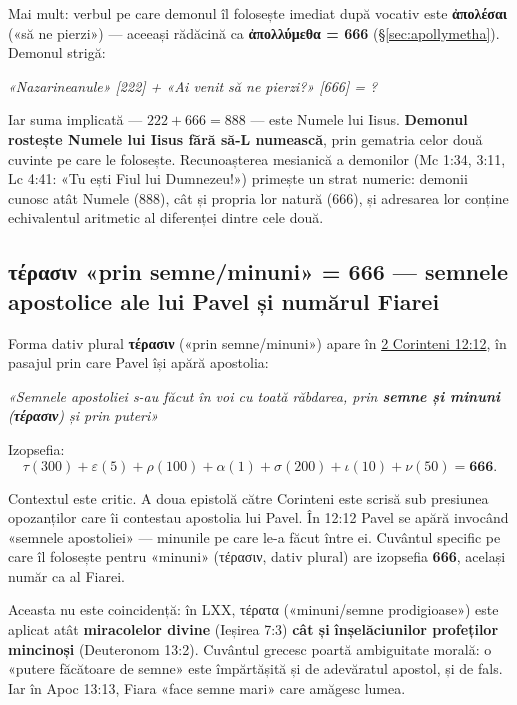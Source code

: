 \documentclass[12pt,a4paper,twoside,openany]{book}
\begin{document}
Mai mult: verbul pe care demonul îl folosește imediat după vocativ este \textbf{ἀπολέσαι} («să ne pierzi») — aceeași rădăcină ca \textbf{ἀπολλύμεθα = 666} (\S\ref{sec:apollymetha}). Demonul strigă:

\begin{biblequote}
\textit{«Nazarineanule» [222] + «Ai venit să ne pierzi?» [666] = ?}
\end{biblequote}

Iar suma implicată — $222 + 666 = 888$ — este Numele lui Iisus. \textbf{Demonul rostește Numele lui Iisus fără să-L numească}, prin gematria celor două cuvinte pe care le folosește. Recunoașterea mesianică a demonilor (Mc 1:34, 3:11, Lc 4:41: «Tu ești Fiul lui Dumnezeu!») primește un strat numeric: demonii cunosc atât Numele (888), cât și propria lor natură (666), și adresarea lor conține echivalentul aritmetic al diferenței dintre cele două.

\subsection{\texorpdfstring{τέρασιν}{terasin} «prin semne/minuni» = 666 — semnele apostolice ale lui Pavel și numărul Fiarei}
\label{sec:terasin}

Forma dativ plural \textbf{τέρασιν} («prin semne/minuni») apare în \href{https://bibliaortodoxa.ro/carte.php?id=72\&cap=12\#12}{2 Corinteni 12:12}, în pasajul prin care Pavel își apără apostolia:

\begin{biblequote}
\textit{«Semnele apostoliei s-au făcut în voi cu toată răbdarea, prin \textbf{semne și minuni} (\textbf{τέρασιν}) și prin puteri»}
\end{biblequote}

Izopsefia:
\[
\tau(300) + \varepsilon(5) + \rho(100) + \alpha(1) + \sigma(200) + \iota(10) + \nu(50) = \mathbf{666}.
\]

Contextul este critic. A doua epistolă către Corinteni este scrisă sub presiunea opozanților care îi contestau apostolia lui Pavel. În 12:12 Pavel se apără invocând «semnele apostoliei» — minunile pe care le-a făcut între ei. Cuvântul specific pe care îl folosește pentru «minuni» (τέρασιν, dativ plural) are izopsefia \textbf{666}, același număr ca al Fiarei.

Aceasta nu este coincidență: în LXX, τέρατα («minuni/semne prodigioase») este aplicat atât \textbf{miracolelor divine} (Ieșirea 7:3) \textbf{cât și} \textbf{înșelăciunilor profeților mincinoși} (Deuteronom 13:2). Cuvântul grecesc poartă ambiguitate morală: o «putere făcătoare de semne» este împărtășită și de adevăratul apostol, și de fals. Iar în Apoc 13:13, Fiara «face semne mari» care amăgesc lumea.
\end{document}
